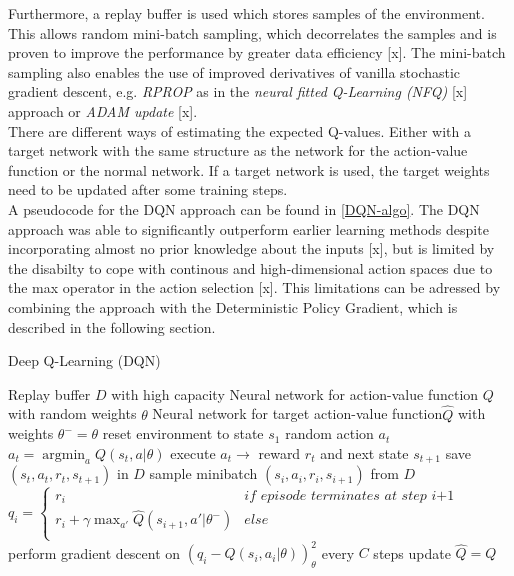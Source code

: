 Furthermore, a replay buffer is used which stores samples of the environment. This allows random mini-batch sampling, which decorrelates the samples and is proven to improve the performance by greater data efficiency [x]. The mini-batch sampling also enables the use of improved derivatives of vanilla stochastic gradient descent, e.g. \textit{RPROP} as in the \textit{neural fitted Q-Learning (NFQ)} [x] approach or \textit{ADAM update} [x].\\
There are different ways of estimating the expected Q-values. Either with a target network with the same structure as the network for the action-value function or the normal network. If a target network is used, the target weights need to be updated after some training steps.\\
A pseudocode for the DQN approach can be found in \ref{DQN-algo}.
The DQN approach was able to significantly outperform earlier learning methods despite incorporating almost no prior knowledge about the inputs [x], but is limited by the disabilty to cope with continous and high-dimensional action spaces due to the max operator in the action selection [x]. This limitations can be adressed by combining the approach with the Deterministic Policy Gradient, which is described in the following section.

\begin{algorithm}
	\caption{Deep Q-Learning (DQN)}\label{DQN-algo}
	\begin{algorithmic}
		\REQUIRE Replay buffer $\mathit{D}$ with high capacity
		\REQUIRE Neural network for action-value function $\mathit{Q}$
		with random weights $\theta$
		\REQUIRE Neural network for target action-value function$
		\mathit{\hat{Q}}$ with weights $\theta^-=\theta$
		\STATE reset environment to state $s_1$
		\STATE random action $a_t$
		\ELSE
		\STATE $a_t=\operatorname*{argmin}_a Q(s_t,a|\theta)$
		\ENDIF
		\STATE execute $a_t \rightarrow$ reward $r_t$ and next state 
		$s_{t+1}$
		\STATE save $(s_t, a_t, r_t,s_{t+1})$ in $D$
		\STATE sample minibatch $(s_i, a_i, r_i,s_{i+1})$ from $D$
		\STATE $q_i =
			\begin{cases}
			r_i & \textit{if episode terminates at step i+1}\\
			r_i+\gamma \max_{a'}\hat{Q}(s_{i+1}, a'|\theta^{-})& 
			else\\			
			\end{cases}$
		\STATE perform gradient descent on $\left(q_i-Q\left(s_i, 
		a_i|\theta\right)\right)^2_\theta$
		\STATE every $C$ steps update $\hat{Q}=Q$
		\ENDFOR
		\ENDFOR
	\end{algorithmic}
\end{algorithm}



